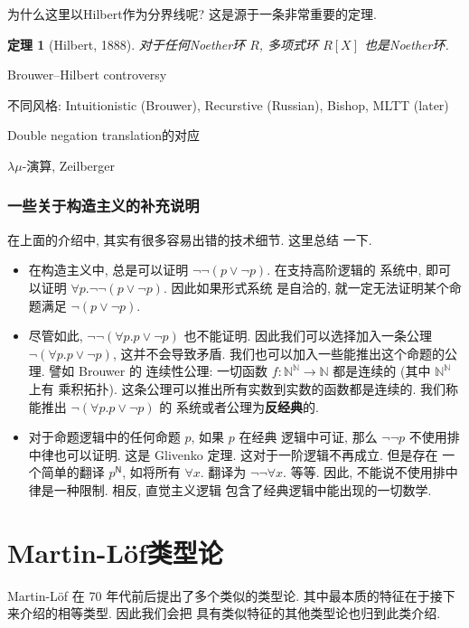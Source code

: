 \documentclass[UTF8]{ctexbook}
\newcommand{\cons}[1]{\textsf{#1}}
\theoremstyle{plain}
\newtheorem{theorem}{定理}[chapter]
\theoremstyle{definition}
\theoremstyle{remark}
\begin{document}
为什么这里以Hilbert作为分界线呢? 这是源于一条非常重要的定理.
\begin{theorem}[Hilbert, 1888]
对于任何Noether环 \(R\), 多项式环 \(R[X]\) 也是Noether环.
\end{theorem}

Brouwer--Hilbert controversy

不同风格: Intuitionistic (Brouwer),
Recurstive (Russian), Bishop, MLTT (later)

Double negation translation的对应

\(\lambda\mu\)-演算, Zeilberger

\subsection{一些关于构造主义的补充说明}
在上面的介绍中, 其实有很多容易出错的技术细节. 这里总结
一下.
\begin{itemize}
\item 在构造主义中, 总是可以证明
\(\neg\neg (p \vee \neg p)\). 在支持高阶逻辑的
系统中, 即可以证明 \(\forall p. \neg\neg (p \vee\neg p)\). 因此如果形式系统
是自洽的, 就一定无法证明某个命题满足 \(\neg (p \vee \neg p)\).
\item 尽管如此, \(\neg\neg(\forall p. p \vee \neg p)\)
也不能证明. 因此我们可以选择加入一条公理
\(\neg (\forall p. p \vee \neg p)\), 这并不会导致矛盾.
我们也可以加入一些能推出这个命题的公理. 譬如 Brouwer 的
连续性公理: 一切函数 \(f : \mathbb N^{\mathbb N} \to \mathbb N\)
都是连续的 (其中 \(\mathbb N^{\mathbb N}\) 上有
乘积拓扑). 这条公理可以推出所有实数到实数的函数都是连续的.
我们称能推出 \(\neg (\forall p. p \vee \neg p)\) 的
系统或者公理为\textbf{反经典}的.
\item 对于命题逻辑中的任何命题 \(p\), 如果 \(p\) 在经典
逻辑中可证, 那么 \(\neg\neg p\) 不使用排中律也可以证明.
这是 Glivenko 定理. 这对于一阶逻辑不再成立. 但是存在
一个简单的翻译 \(p^{\cons N}\), 如将所有
\(\forall x.\) 翻译为 \(\neg \neg \forall x.\) 等等.
因此, 不能说不使用排中律是一种限制. 相反, 直觉主义逻辑
包含了经典逻辑中能出现的一切数学.
\end{itemize}

\chapter{Martin-L\"of类型论}\label{martinlof}

Martin-L\"of 在 70 年代前后提出了多个类似的类型论.
其中最本质的特征在于接下来介绍的相等类型. 因此我们会把
具有类似特征的其他类型论也归到此类介绍.
\end{document}
